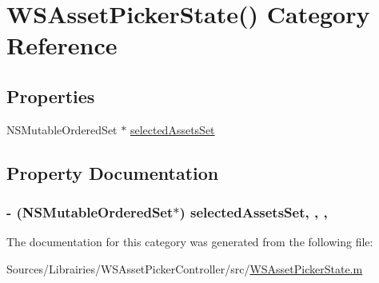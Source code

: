 \hypertarget{category_w_s_asset_picker_state_07_08}{\section{W\-S\-Asset\-Picker\-State() Category Reference}
\label{category_w_s_asset_picker_state_07_08}
}
\subsection*{Properties}
\begin{DoxyCompactItemize}
\item 
N\-S\-Mutable\-Ordered\-Set $\ast$ \hyperlink{category_w_s_asset_picker_state_07_08_a99466cce2d8286ef1da2c6595624ca0e}{selected\-Assets\-Set}
\end{DoxyCompactItemize}


\subsection{Property Documentation}
\hypertarget{category_w_s_asset_picker_state_07_08_a99466cce2d8286ef1da2c6595624ca0e}{
\subsubsection[{selected\-Assets\-Set}]{\setlength{\rightskip}{0pt plus 5cm}-\/ (N\-S\-Mutable\-Ordered\-Set$\ast$) selected\-Assets\-Set\hspace{0.3cm}{\ttfamily [read]}, {\ttfamily [write]}, {\ttfamily [nonatomic]}, {\ttfamily [strong]}}}\label{category_w_s_asset_picker_state_07_08_a99466cce2d8286ef1da2c6595624ca0e}


The documentation for this category was generated from the following file\-:\begin{DoxyCompactItemize}
\item 
Sources/\-Librairies/\-W\-S\-Asset\-Picker\-Controller/src/\hyperlink{_w_s_asset_picker_state_8m}{W\-S\-Asset\-Picker\-State.\-m}\end{DoxyCompactItemize}
